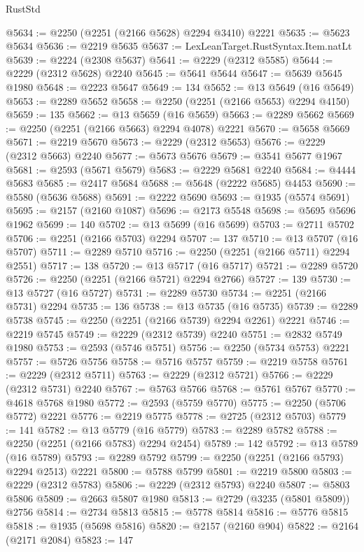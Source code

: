 \begin{lexlean}{RustStd}
\begin{coremodule}
{\begin{coremodule}
{{{{{{{{{{{{{{{{{{{{{{{{{{{{{{{{{{{{{{{{{{{{{{{{{{{{{@5634 := @2250 (@2251 (@2166 @5628) @2294 @3410) @2221
@5635 := @5623 @5634
@5636 := @2219 @5635
@5637 := LexLeanTarget.RustSyntax.Item.natLt
@5639 := @2224 (@2308 @5637)
@5641 := @2229 (@2312 @5585)
@5644 := @2229 (@2312 @5628) @2240
@5645 := @5641 @5644
@5647 := @5639 @5645 @1980
@5648 := @2223 @5647
@5649 := 134
@5652 := @13 @5649 (@16 @5649)
@5653 := @2289 @5652
@5658 := @2250 (@2251 (@2166 @5653) @2294 @4150)
@5659 := 135
@5662 := @13 @5659 (@16 @5659)
@5663 := @2289 @5662
@5669 := @2250 (@2251 (@2166 @5663) @2294 @4078) @2221
@5670 := @5658 @5669
@5671 := @2219 @5670
@5673 := @2229 (@2312 @5653)
@5676 := @2229 (@2312 @5663) @2240
@5677 := @5673 @5676
@5679 := @3541 @5677 @1967
@5681 := @2593 (@5671 @5679)
@5683 := @2229 @5681 @2240
@5684 := @4444 @5683
@5685 := @2417 @5684
@5688 := @5648 (@2222 @5685) @4453
@5690 := @5580 (@5636 @5688)
@5691 := @2222 @5690
@5693 := @1935 (@5574 @5691)
@5695 := @2157 (@2160 @1087)
@5696 := @2173 @5548
@5698 := @5695 @5696 @1962
@5699 := 140
@5702 := @13 @5699 (@16 @5699)
@5703 := @2711 @5702
@5706 := @2251 (@2166 @5703) @2294
@5707 := 137
@5710 := @13 @5707 (@16 @5707)
@5711 := @2289 @5710
@5716 := @2250 (@2251 (@2166 @5711) @2294 @2551)
@5717 := 138
@5720 := @13 @5717 (@16 @5717)
@5721 := @2289 @5720
@5726 := @2250 (@2251 (@2166 @5721) @2294 @2766)
@5727 := 139
@5730 := @13 @5727 (@16 @5727)
@5731 := @2289 @5730
@5734 := @2251 (@2166 @5731) @2294
@5735 := 136
@5738 := @13 @5735 (@16 @5735)
@5739 := @2289 @5738
@5745 := @2250 (@2251 (@2166 @5739) @2294 @2261) @2221
@5746 := @2219 @5745
@5749 := @2229 (@2312 @5739) @2240
@5751 := @2832 @5749 @1980
@5753 := @2593 (@5746 @5751)
@5756 := @2250 (@5734 @5753) @2221
@5757 := @5726 @5756
@5758 := @5716 @5757
@5759 := @2219 @5758
@5761 := @2229 (@2312 @5711)
@5763 := @2229 (@2312 @5721)
@5766 := @2229 (@2312 @5731) @2240
@5767 := @5763 @5766
@5768 := @5761 @5767
@5770 := @4618 @5768 @1980
@5772 := @2593 (@5759 @5770)
@5775 := @2250 (@5706 @5772) @2221
@5776 := @2219 @5775
@5778 := @2725 (@2312 @5703)
@5779 := 141
@5782 := @13 @5779 (@16 @5779)
@5783 := @2289 @5782
@5788 := @2250 (@2251 (@2166 @5783) @2294 @2454)
@5789 := 142
@5792 := @13 @5789 (@16 @5789)
@5793 := @2289 @5792
@5799 := @2250 (@2251 (@2166 @5793) @2294 @2513) @2221
@5800 := @5788 @5799
@5801 := @2219 @5800
@5803 := @2229 (@2312 @5783)
@5806 := @2229 (@2312 @5793) @2240
@5807 := @5803 @5806
@5809 := @2663 @5807 @1980
@5813 := @2729 (@3235 (@5801 @5809)) @2756
@5814 := @2734 @5813
@5815 := @5778 @5814
@5816 := @5776 @5815
@5818 := @1935 (@5698 @5816)
@5820 := @2157 (@2160 @904)
@5822 := @2164 (@2171 @2084)
@5823 := 147
}}}}}}}}}}}}}}}}}}}}}}}}}}}}}}}}}}}}}}}}}}}}}}}}}}}}}
\end{coremodule}}
\end{coremodule}
\end{lexlean}
